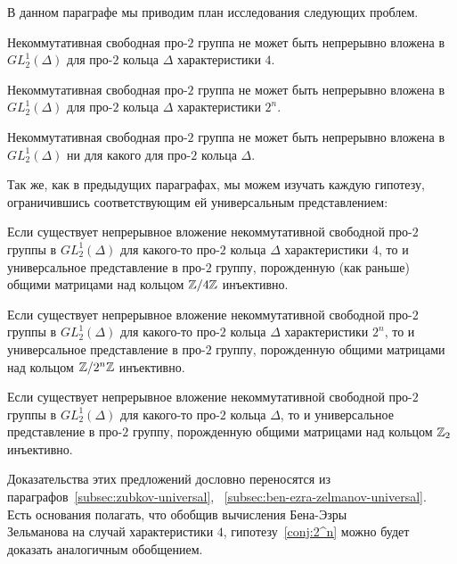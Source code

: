 В данном параграфе мы приводим план исследования следующих проблем.

\begin{conjecture}
    \label{conj:4}
    Некоммутативная свободная про-$2$ группа не может быть непрерывно вложена в $GL^1_2(\Delta)$ для про-$2$ кольца $\Delta$ характеристики $4$.
\end{conjecture}
\begin{conjecture}
    \label{conj:2^n}
    Некоммутативная свободная про-$2$ группа не может быть непрерывно вложена в $GL^1_2(\Delta)$ для про-$2$ кольца $\Delta$ характеристики $2^n$.
\end{conjecture}
\begin{conjecture}
    \label{conj:2_n}
    Некоммутативная свободная про-$2$ группа не может быть непрерывно вложена в $GL^1_2(\Delta)$ ни для какого для про-$2$ кольца $\Delta$.
\end{conjecture}
\vskip 0.1in\noindent

Так же, как в предыдущих параграфах, мы можем изучать каждую гипотезу, ограничившись соответствующим ей универсальным представлением:

\vskip 0.1in\noindent
\begin{proposition}
    Если существует непрерывное вложение некоммутативной свободной про-$2$ группы в $GL_2^1(\Delta)$ для какого-то про-$2$ кольца $\Delta$ характеристики $4$, то и универсальное представление в про-$2$ группу, порожденную (как раньше) общими матрицами над кольцом $\mathbb{Z}/4\mathbb{Z}$ инъективно.
\end{proposition}
\vskip 0.1in\noindent
\begin{proposition}
    Если существует непрерывное вложение некоммутативной свободной про-$2$ группы в $GL_2^1(\Delta)$ для какого-то про-$2$ кольца $\Delta$ характеристики $2^n$, то и универсальное представление в про-$2$ группу, порожденную общими матрицами над кольцом $\mathbb{Z}/2^n\mathbb{Z}$ инъективно.
\end{proposition}
\vskip 0.1in\noindent
\begin{proposition}
    Если существует непрерывное вложение некоммутативной свободной про-$2$ группы в $GL_2^1(\Delta)$ для какого-то про-$2$ кольца $\Delta$, то и универсальное представление в про-$2$ группу, порожденную общими матрицами над кольцом $\mathbb{Z}_2$ инъективно.
\end{proposition}
\vskip 0.1in\noindent

Доказательства этих предложений дословно переносятся из параграфов~\ref{subsec:zubkov-universal}, ~\ref{subsec:ben-ezra-zelmanov-universal}.\\
Есть основания полагать, что обобщив вычисления Бена-Эзры\textemdash \\Зельманова на случай характеристики $4$, гипотезу~\ref{conj:2^n} можно будет доказать аналогичным обобщением.

